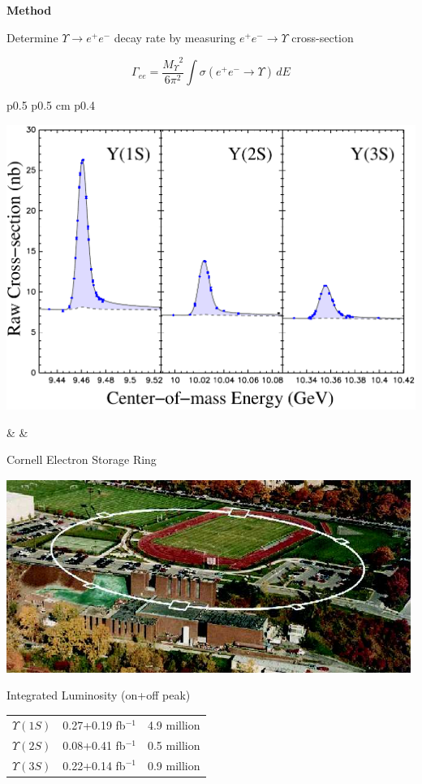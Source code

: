 \documentclass[landscape]{article}
\newenvironment{slide}[1][ ]{\mbox{\bf #1 } \vfill}{\vfill \mbox{ } \hfill \Large \arabic{page} \pagebreak}
\newcommand{\inv}{$^{-1}$}
\newcommand{\us}{$\Upsilon(1S)$}
\newcommand{\uss}{$\Upsilon(2S)$}
\newcommand{\usss}{$\Upsilon(3S)$}
\begin{document}
\begin{slide}[Method]

Determine $\Upsilon \to e^+e^-$ decay rate by measuring $e^+e^- \to \Upsilon$ cross-section

{\Huge
\[ \Gamma_{ee} = \frac{{M_\Upsilon}^2}{6 \pi^2} \int \sigma(e^+e^- \to \Upsilon) \, dE \]
}

\vspace{0.5 cm}
\begin{center}
\begin{tabular}{p{0.5\linewidth} p{0.5 cm} p{0.4\linewidth}}
\begin{minipage}{\linewidth}
\includegraphics[width=\linewidth]{samplescans}
\end{minipage} & &
\begin{minipage}{\linewidth}
\begin{center}
Cornell Electron Storage Ring

\includegraphics[width=0.8\linewidth]{aerial}

\vspace{0.5 cm}
\Large Integrated Luminosity (on+off peak)

\begin{tabular}{l l l}
  \us & 0.27+0.19 fb\inv & 4.9 million \\
  \uss & 0.08+0.41 fb\inv & 0.5 million \\
  \usss & 0.22+0.14 fb\inv & 0.9 million \\
\end{tabular}
\end{center}
\end{minipage}
\end{tabular}
\end{center}


\end{slide}
\end{document}
